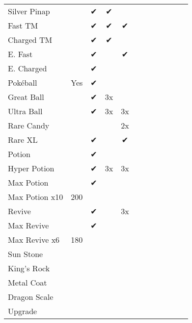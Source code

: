 \begin{table}
\begin{tabular}{p{}ccccccccccc}
Silver Pinap      &      & ✔ & ✔         &    &     &     &     &   &   &   \\
Fast TM           &      & ✔ & ✔         & ✔  &     &     &     &   &   &   \\
Charged TM        &      & ✔ & ✔         &    &     &     &     &   &   &   \\
E. Fast           &      & ✔ &           & ✔  &     &     &     &   &   &   \\
E. Charged        &      & ✔ &           &    &     &     &     &   &   &   \\
Pokéball          & Yes  & ✔ &           &    &     &     &     &   &   &   \\
Great Ball        &      & ✔ & 3x        &    &     &     &     &   &   &   \\
Ultra Ball        &      & ✔ & 3x        & 3x &     &     &     &   &   &   \\
Rare Candy        &      &   &           & 2x &     &     &     &   &   &   \\
Rare XL           &      & ✔ &           & ✔  &     &     &     &   &   &   \\
Potion            &      & ✔ &           &    &     &     &     &   &   &   \\
Hyper Potion      &      & ✔ & 3x        & 3x &     &     &     &   &   &   \\
Max Potion        &      & ✔ &           &    &     &     &     &   &   &   \\
Max Potion x10    & 200  &   &           &    &     &     &     &   &   &   \\
Revive            &      & ✔ &           & 3x &     &     &     &   &   &   \\
Max Revive        &      & ✔ &           &    &     &     &     &   &   &   \\
Max Revive x6     & 180  &   &           &    &     &     &     &   &   &   \\
Sun Stone         &      &   &           &    &     &     &     &   &   &   \\
King's Rock       &      &   &           &    &     &     &     &   &   &   \\
Metal Coat        &      &   &           &    &     &     &     &   &   &   \\
Dragon Scale      &      &   &           &    &     &     &     &   &   &   \\
Upgrade           &      &   &           &    &     &     &     &   &   &   \\

\end{tabular}
\end{table}
